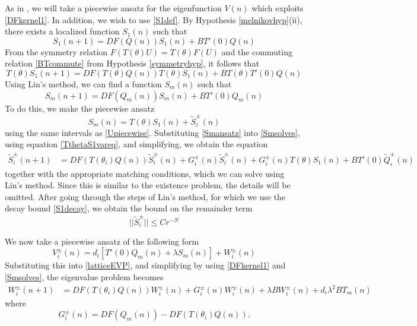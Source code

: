 \documentclass[12pt]{article}
\begin{document}
As in \cite{Sandstede1998}, we will take a piecewise ansatz for the eigenfunction $V(n)$ which exploits \eqref{DFkernel1}. In addition, we wish to use \eqref{S1def}. By Hypothesis \ref{melnikovhyp}(ii), there exists a localized function $S_1(n)$ such that 
\begin{equation}\label{S1vareq}
S_1(n+1) = DF(Q(n)) S_1(n) + B T'(0) Q(n)
\end{equation}
From the symmetry relation $F(T(\theta)U) = T(\theta)F(U)$ and the commuting relation \eqref{BTcommute} from Hypothesis \ref{symmetryhyp}, it follows that
\begin{equation}\label{TthetaS1vareq}
T(\theta)S_1(n+1) = DF(T(\theta)Q(n)) T(\theta)S_1(n) + B T(\theta) T'(0)Q(n)
\end{equation}
Using Lin's method, we can find a function $S_m(n)$ such that
\begin{equation}\label{Smsolves}
S_m(n+1) = DF(Q_m(n)) S_m(n) + B T'(0) Q_m(n)
\end{equation}
To do this, we make the piecewise ansatz 
\begin{equation}\label{Smansatz}
S_m(n) = T(\theta)S_1(n) + \tilde{S}_i^\pm(n)
\end{equation}
using the same intervals as \eqref{Upiecewise}. Substituting \eqref{Smansatz} into \eqref{Smsolves}, using equation \eqref{TthetaS1vareq}, and simplifying, we obtain the equation
\begin{align*}
\tilde{S}_i^\pm(n+1) 
&= DF(T(\theta_i)Q(n)) \tilde{S}_i^\pm(n)
+ G_i^\pm(n)\tilde{S}_i^\pm(n) + G_i^\pm(n) T(\theta)S_1(n) + B T'
(0) \tilde{Q}_i^\pm(n)
\end{align*}
together with the appropriate matching conditions, which we can solve using Lin's method. Since this is similar to the existence problem, the details will be omitted. After going through the steps of Lin's method, for which we use the decay bound \eqref{S1decay}, we obtain the bound on the remainder term
\begin{equation}\label{Sipmbound}
|| \tilde{S}_i^\pm || \leq C r^{-N}
\end{equation}

We now take a piecewise ansatz of the following form
\begin{equation}\label{Viansatz2}
V_i^\pm(n) = 
d_i [ T'(0)Q_m(n) + \lambda S_m(n) ] + W_i^\pm(n)
\end{equation}
Substituting this into \eqref{latticeEVP}, and simplifying by using \eqref{DFkernel1} and \eqref{Smsolves}, the eigenvalue problem becomes
\begin{align}\label{Weq1}
W_i^\pm(n+1)
&= DF(T(\theta_i) Q(n) ) W_i^\pm(n) + G_i^\pm(n)W_i^\pm(n) + \lambda B W_i^\pm(n) + d_i \lambda^2 B T_m(n)
\end{align}
where
\begin{equation}
G_i^\pm(n) = DF(Q_m(n)) - DF(T(\theta_i) Q(n) ).
\end{equation}
\end{document}
